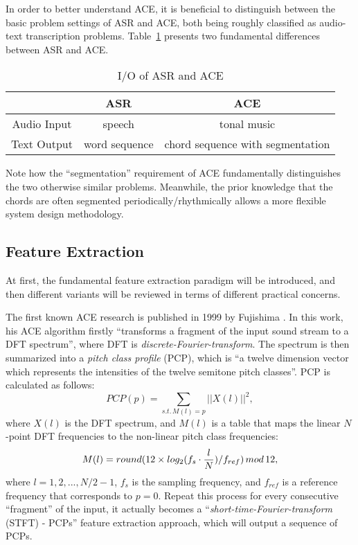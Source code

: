 In order to better understand ACE, it is beneficial to distinguish between the basic problem settings of ASR and ACE, both being roughly classified as audio-text transcription problems. Table~\ref{tab:2-asrace} presents two fundamental differences between ASR and ACE.
\begin{table}[htb]
\caption{I/O of ASR and ACE}
\centering
\footnotesize
\begin{tabular}{|c|c|c|} \hline
	& ASR & ACE \\ \hline
Audio Input & speech & tonal music \\ \hline
Text Output & word sequence & chord sequence with segmentation \\ \hline
\end{tabular}
\label{tab:2-asrace}
\end{table}
Note how the ``segmentation'' requirement of ACE fundamentally distinguishes the two otherwise similar problems. Meanwhile, the prior knowledge that the chords are often segmented periodically/rhythmically allows a more flexible system design methodology.


\subsection{Feature Extraction} \label{sec:2-fe}
At first, the fundamental feature extraction paradigm will be introduced, and then different variants will be reviewed in terms of different practical concerns.

The first known ACE research is published in 1999 by Fujishima \cite{fujishima1999realtime}. In this work, his ACE algorithm firstly ``transforms a fragment of the input sound stream to a DFT spectrum'', where DFT is {\it discrete-Fourier-transform}. The spectrum is then summarized into a {\it pitch class profile} (PCP), which is ``a twelve dimension vector which represents the intensities of the twelve semitone pitch classes''. PCP is calculated as follows:
\begin{equation}
PCP(p) = \sum_{s.t.\,M(l)=p}{||X(l)||^2},
\end{equation}
where $X(l)$ is the DFT spectrum, and $M(l)$ is a table that maps the linear $N$-point DFT frequencies to the non-linear pitch class frequencies:
\begin{equation}
M(l) = round(12 \times log_2({f_s} \cdot {l\over N})/f_{ref})\,mod\,12,
\end{equation}
where $l=1,2,...,N/2-1$, $f_s$ is the sampling frequency, and $f_{ref}$ is a reference frequency that corresponds to $p=0$. Repeat this process for every consecutive ``fragment'' of the input, it actually becomes a ``{\it short-time-Fourier-transform} (STFT) - PCPs'' feature extraction approach, which will output a sequence of PCPs.

